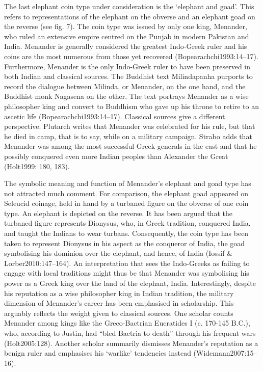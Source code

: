 \documentclass{ijsra}
\begin{document}
The last elephant coin type under consideration is the ‘elephant and goad’.
This refers to representations of the elephant on the obverse and an elephant goad on the reverse (see fig. 7). 
The coin type was issued by only one king, Menander, who ruled an extensive empire centred on the Punjab in modern Pakistan and India. 
Menander is generally considered the greatest Indo-Greek ruler and his coins are the most numerous from those yet recovered
(Bopearachchi1993:14–17).
Furthermore, Menander is the only Indo-Greek ruler to have been preserved in both Indian and classical sources. 
The Buddhist text Milindapanha purports to record the dialogue between Milinda, or Menander, on the one hand,
and the Buddhist monk Nagasena on the other. 
The text portrays Menander as a wise philosopher king and convert to Buddhism who gave up his throne to retire to an ascetic life
(Bopearachchi1993:14–17). 
Classical sources give a different perspective.
Plutarch writes that Menander was celebrated for his rule, but that he died in camp, that is to say, while on a military campaign. 
Strabo adds that Menander was among the most successful Greek generals in the east and that he possibly conquered even more
Indian peoples than Alexander the Great (Holt1999: 180, 183).

The symbolic meaning and function of Menander’s elephant and goad type has not attracted much comment. 
For comparison, the elephant goad appeared on Seleucid coinage, held in hand by a turbaned figure on the obverse of one coin type.
An elephant is depicted on the reverse. 
It has been argued that the turbaned figure represents Dionysus, who, in Greek tradition, conquered India,
and taught the Indians to wear turbans.
Consequently, the coin type has been taken to represent Dionysus in his aspect as the conqueror of India,
the goad symbolising his dominion over the elephant, and hence, of India (Iossif & Lorber2010:147–164). 
An interpretation that sees the Indo-Greeks as failing to engage with local traditions might thus be that Menander was
symbolising his power as a Greek king over the land of the elephant, India.
Interestingly, despite his reputation as a wise philosopher king in Indian tradition, the military dimension of Menander’s
career has been emphasised in scholarship. 
This arguably reflects the weight given to classical sources.
One scholar counts Menander among kings like the Greco-Bactrian Eucratides I (c. 170-145 B.C.), who, according to Justin,
had “bled Bactria to death” through his frequent wars (Holt2005:128). 
Another scholar summarily dismisses Menander’s reputation as a benign ruler and emphasises his ‘warlike’ tendencies instead (Widemann2007:15–16).
\end{document}
